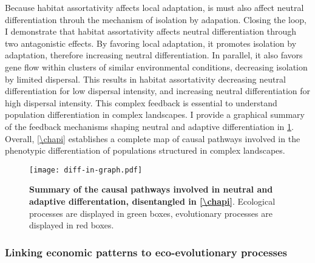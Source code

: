 Because habitat assortativity affects local adaptation, is must also affect neutral differentiation throuh the mechanism of isolation by adapation. Closing the loop, I demonstrate that habitat assortativity affects neutral differentiation through two antagonistic effects. By favoring local adaptation, it promotes isolation by adaptation, therefore increasing neutral differentiation. In parallel, it also favors gene flow within clusters of similar environmental conditions, decreasing isolation by limited dispersal. This results in habitat assortativity decreasing neutral differentiation for low dispersal intensity, and increasing neutral differentiation for high dispersal intensity.
% 
This complex feedback is essential to understand population differentiation in complex landscapes.
% 
I provide a graphical summary of the feedback mechanisms shaping neutral and adaptive differentiation in \cref{fig:summary_diff-in-graph}. Overall, \cref{\chapi} establishes a complete map of causal pathways involved in the phenotypic differentiation of populations structured in complex landscapes. %

\begin{figure}[t]
    \centering
    \texttt{[image: diff-in-graph.pdf]}
    \caption{\textbf{Summary of the causal pathways involved in neutral and adaptive differentation, disentangled in \cref{\chapi}}. Ecological processes are displayed in green boxes, evolutionary processes are displayed in red boxes.}
    \label{fig:summary_diff-in-graph}
\end{figure}


\subsubsection{Linking economic patterns to eco-evolutionary processes}

